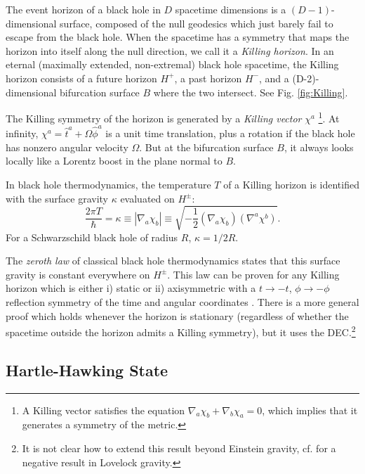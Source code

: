 \documentclass[12pt,a4paper]{article}
\def\be{\begin{equation}}
\def\ee{\end{equation}}
\begin{document}
The event horizon of a black hole in $D$ spacetime dimensions is a $(D-1)$-dimensional surface, composed of the null geodesics which just barely fail to escape from the black hole.  When the spacetime has a symmetry that maps the horizon into itself along the null direction, we call it a \emph{Killing horizon}.  In an eternal (maximally extended, non-extremal) black hole spacetime, the Killing horizon consists of a future horizon $H^+$, a past horizon $H^-$, and a (D-2)-dimensional bifurcation surface $B$ where the two intersect.  See Fig. \ref{fig:Killing}.

The Killing symmetry of the horizon is generated by a \emph{Killing vector} $\chi^a$ \footnote{A Killing vector satisfies the equation $\nabla_a \chi_b + \nabla_b \chi_a = 0$, which implies that it generates a symmetry of the metric.}.  At infinity, $\chi^a = \hat{t}^a + \Omega \hat{\phi}^a$ is a unit time translation, plus a rotation if the black hole has nonzero angular velocity $\Omega$.  But at the bifurcation surface $B$, it always looks locally like a Lorentz boost in the plane normal to $B$.  
 

In black hole thermodynamics, the temperature $T$ of a Killing horizon is identified with the surface gravity $\kappa$ evaluated on $H^{\pm}$:
\be
\frac{2\pi T}{\hbar} = \kappa \equiv \left\lvert \nabla_a \chi_b \right\rvert \equiv \sqrt{-\frac{1}{2} (\nabla_a \chi_b)(\nabla^a \chi^b)}.
\ee
For a Schwarzschild black hole of radius $R$, $\kappa = 1/2R$.

The \emph{zeroth law} of classical black hole thermodynamics states that this surface gravity is constant everywhere on $H^\pm$.  This law can be proven for any Killing horizon which is either i) static or ii) axisymmetric with a $t \to -t$, $\phi \to -\phi$ reflection symmetry of the time and angular coordinates \cite{carter1971axisymmetric,racz1996global}.  There is a more general proof which holds whenever the horizon is stationary (regardless of whether the spacetime outside the horizon admits a Killing symmetry), but it uses the DEC.\footnote{It is not clear how to extend this result beyond Einstein gravity, cf. \cite{sarkar2013issue} for a negative result in Lovelock gravity.}

\subsection{Hartle-Hawking State}\label{sec:HH}
\end{document}
